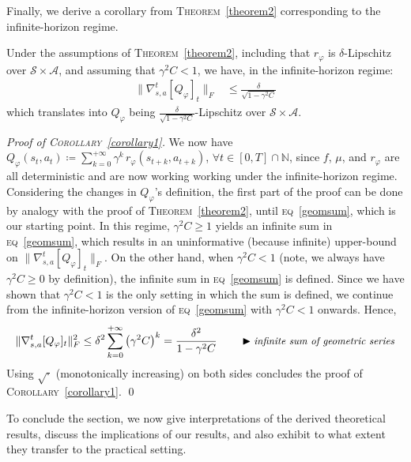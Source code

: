 Finally, we derive a corollary from \textsc{Theorem}~\ref{theorem2}
corresponding to the infinite-horizon regime.

\begin{corollary}
\label{corollary1}
Under the assumptions of \textsc{Theorem}~\ref{theorem2},
including that $r_\varphi$ is $\delta$-Lipschitz over $\mathcal{S} \times \mathcal{A}$,
and assuming that $\gamma^2 C < 1$, we have, in the infinite-horizon regime:
\begin{align}
\lVert \nabla_{s,a}^t[Q_\varphi]_t \rVert _F
&\leq \frac{\delta}{\sqrt{1 - \gamma^2 C}}
\end{align}
which translates into $Q_\varphi$ being $\frac{\delta}{\sqrt{1 - \gamma^2 C}}$-Lipschitz
over $\mathcal{S} \times \mathcal{A}$.
\end{corollary}

\emph{Proof of \textsc{Corollary}~\ref{corollary1}.}
We now have
$Q_\varphi (s_t, a_t) \coloneqq \sum_{k=0}^{+\infty} \gamma^k \, r_\varphi (s_{t+k}, a_{t+k})$,
$\forall t \in [0, T] \cap \mathbb{N}$,
since $f$, $\mu$, and $r_\varphi$ are all deterministic
and are now working working under the infinite-horizon regime.
Considering the changes in $Q_\varphi$'s definition, the first part of the proof
can be done by analogy with the proof of \textsc{Theorem}~\ref{theorem2},
until \textsc{eq}~\ref{geomsum}, which is our starting point.
In this regime, $\gamma^2 C \geq 1$ yields an infinite sum in \textsc{eq}~\ref{geomsum},
which results in an uninformative (because infinite) upper-bound on
$\lVert \nabla_{s,a}^t[Q_\varphi]_t \rVert _F$.
On the other hand, when $\gamma^2 C < 1$
(note, we always have $\gamma^2 C \geq 0$ by definition),
the infinite sum in \textsc{eq}~\ref{geomsum} is defined.
Since we have shown that $\gamma^2 C < 1$ is the only setting in which the sum is defined,
we continue from the infinite-horizon version of \textsc{eq}~\ref{geomsum}
with $\gamma^2 C < 1$ onwards. Hence,
\begin{align}
\lVert \nabla_{s,a}^t[Q_\varphi]_t \rVert _F^2
\leq \delta^2 \sum_{k=0}^{+\infty} \big( \gamma^2 C \big)^k
= \frac{\delta^2}{1 - \gamma^2 C}
\qquad
\blacktriangleright\text{\small{\textit{infinite sum of geometric series}}}
\end{align}
Using $\sqrt{\cdot}$ (monotonically increasing) on both sides
concludes the proof of \textsc{Corollary}~\ref{corollary1}. \qed

To conclude the section, we now give interpretations of the derived theoretical results,
discuss the implications of our results, and also exhibit to what extent they
transfer to the practical setting.

